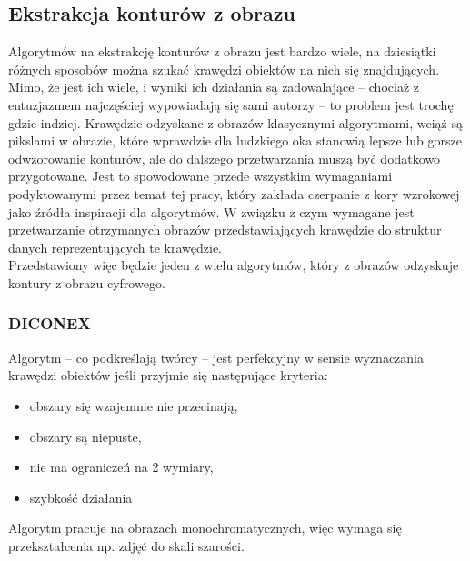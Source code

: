 \subsection{Ekstrakcja konturów z obrazu}
\label{integracjaSEC}


Algorytmów na ekstrakcję konturów z obrazu jest bardzo wiele, na dziesiątki różnych sposobów można szukać krawędzi obiektów na nich się znajdujących. Mimo, że jest ich wiele, i wyniki ich działania są zadowalające -- chociaż z entuzjazmem najczęściej wypowiadają się sami autorzy -- to problem jest trochę gdzie indziej. Krawędzie odzyskane z obrazów klasycznymi algorytmami, wciąż są pikslami w obrazie, które wprawdzie dla ludzkiego oka stanowią lepsze lub gorsze odwzorowanie konturów, ale do dalszego przetwarzania muszą być dodatkowo przygotowane. Jest to spowodowane przede wszystkim wymaganiami podyktowanymi przez temat tej pracy, który zakłada czerpanie z kory wzrokowej jako źródła inspiracji dla algorytmów. W związku z czym wymagane jest przetwarzanie otrzymanych obrazów przedstawiających krawędzie do struktur danych reprezentujących te krawędzie.\\

Przedstawiony więc będzie jeden z wielu algorytmów, który z obrazów odzyskuje kontury z obrazu cyfrowego.


\label{diconex}
\subsubsection{DICONEX}

Algorytm -- co podkreślają twórcy -- jest perfekcyjny w sensie wyznaczania krawędzi obiektów jeśli przyjmie się następujące kryteria:
\begin{itemize}
\item obszary się wzajemnie nie przecinają,
\item obszary są niepuste,
\item nie ma ograniczeń na 2 wymiary,
\item szybkość działania
\end{itemize}
Algorytm pracuje na obrazach monochromatycznych, więc wymaga się przekształcenia np. zdjęć do skali szarości.

